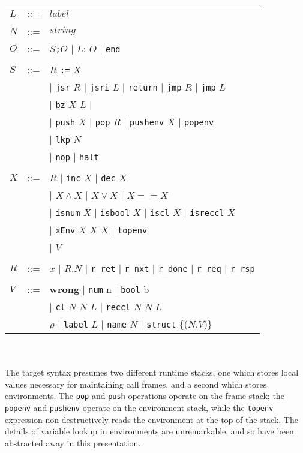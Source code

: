 \documentclass[a4paper,10pt]{article}
\begin{document}
\begin{tabular}[t]{lll}
$L$ &::=& $label$\\
$N$ &::=& $string$\\
$O$ &::=& $S$\texttt{;}$O$ $\vert$ $L$: $O$ $\vert$ \texttt{end}\\
\\
$S$ &::=& $R$ \texttt{:=} $X$\\
&& $\vert$ \texttt{jsr} $R$ $\vert$ \texttt{jsri} $L$ $\vert$ \texttt{return} $\vert$ \texttt{jmp} $R$ $\vert$ \texttt{jmp} $L$\\
&& $\vert$ \texttt{bz} $X$ $L$ $\vert$\\
&& $\vert$ \texttt{push} $X$ $\vert$ \texttt{pop} $R$ $\vert$ \texttt{pushenv} $X$ $\vert$ \texttt{popenv}\\
&& $\vert$ \texttt{lkp} $N$\\
&& $\vert$ \texttt{nop} $\vert$ \texttt{halt}\\
\\
$X$ &::=& $R$ $\vert$ \texttt{inc} $X$ $\vert$ \texttt{dec} $X$\\
&& $\vert$ $X \land X$ $\vert$ $X \lor X$ $\vert$ $X == X$\\
&& $\vert$ \texttt{isnum} $X$ $\vert$ \texttt{isbool} $X$  $\vert$ \texttt{iscl} $X$  $\vert$ \texttt{isreccl} $X$\\
&& $\vert$ \texttt{xEnv} $X$ $X$ $X$ $\vert$ \texttt{topenv}\\
&& $\vert$ $V$\\
\\
$R$ &::=& $x$ $\vert$ $R$.$N$ $\vert$ \texttt{r\_ret} $\vert$ \texttt{r\_nxt} $\vert$ \texttt{r\_done} $\vert$ \texttt{r\_req} $\vert$ \texttt{r\_rsp}\\
\\
$V$ &::=& \textbf{wrong} $\vert$ \texttt{num} n $\vert$ \texttt{bool} b\\
&&$\vert$ \texttt{cl} $N$ $N$ $L$ $\vert$ \texttt{reccl} $N$ $N$ $L$\\
&&$\rho$ $\vert$ \texttt{label} $L$ $\vert$ \texttt{name} $N$ $\vert$ \texttt{struct} \{($N$,$V$)\}

\end{tabular}
\\
\\
The target syntax presumes two different runtime stacks, one which stores local values necessary for maintaining call frames, and a second which stores environments.  The \texttt{pop} and \texttt{push} operations operate on the frame stack; the \texttt{popenv} and \texttt{pushenv} operate on the environment stack, while the \texttt{topenv} expression non-destructively reads the environment at the top of the stack. The details of variable lookup in environments are unremarkable, and so have been abstracted away in this presentation.
\end{document}
